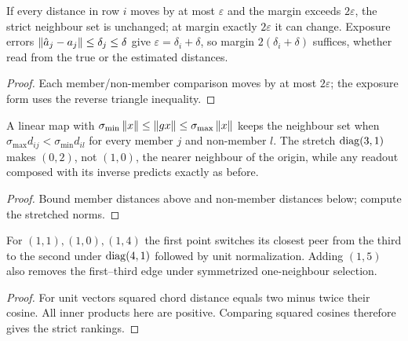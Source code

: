 \begin{theorem}\label{thm:neighbours-margin}
  \leanok
  If every distance in row $i$ moves by at most $\varepsilon$ and the margin
  exceeds $2\varepsilon$, the strict neighbour set is unchanged; at margin
  exactly $2\varepsilon$ it can change. Exposure errors
  $\left\lVert\hat a_j-a_j\right\rVert\le\delta_j\le\delta$ give
  $\varepsilon=\delta_i+\delta$, so margin $2(\delta_i+\delta)$ suffices,
  whether read from the true or the estimated distances.
\end{theorem}
\begin{proof}\leanok
  Each member/non-member comparison moves by at most $2\varepsilon$; the
  exposure form uses the reverse triangle inequality.
\end{proof}

\begin{theorem}\label{thm:neighbours-linear}
  \leanok
  A linear map with $\sigma_{\min}\left\lVert x\right\rVert\le\left\lVert gx\right\rVert\le\sigma_{\max}\left\lVert x\right\rVert$
  keeps the neighbour set when $\sigma_{\max}d_{ij}<\sigma_{\min}d_{il}$ for
  every member $j$ and non-member $l$. The stretch $\operatorname{diag}(3,1)$ makes $(0,2)$,
  not $(1,0)$, the nearer neighbour of the origin, while any readout composed
  with its inverse predicts exactly as before.
\end{theorem}
\begin{proof}\leanok
  Bound member distances above and non-member distances below; compute the
  stretched norms.
\end{proof}

\begin{theorem}
  \leanok
  For $(1,1),(1,0),(1,4)$ the first point switches its closest peer
  from the third to the second under $\operatorname{diag}(4,1)$ followed by unit
  normalization. Adding $(1,5)$ also removes the first--third edge
  under symmetrized one-neighbour selection.
\end{theorem}
\begin{proof}\leanok
  For unit vectors squared chord distance equals two minus
  twice their cosine. All inner products here are positive. Comparing
  squared cosines therefore gives the strict rankings.
\end{proof}

